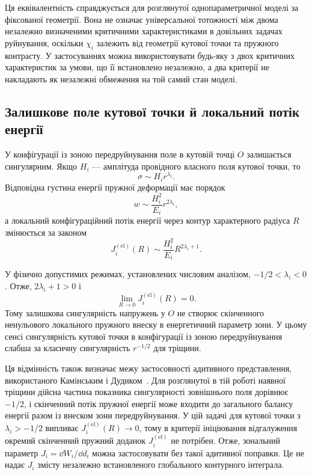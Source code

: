 Ця еквівалентність справджується для розглянутої однопараметричної моделі за фіксованої геометрії. Вона не означає універсальної тотожності між двома незалежно визначеними критичними характеристиками в довільних задачах руйнування, оскільки $\chi_i$ залежить від геометрії кутової точки та пружного контрасту. У застосуваннях можна використовувати будь-яку з двох критичних характеристик за умови, що її встановлено незалежно, а два критерії не накладають як незалежні обмеження на той самий стан моделі.

\subsection{Залишкове поле кутової точки й локальний потік енергії}
\label{subsec:discussion-flux}

У конфігурації із зоною передруйнування поле в кутовій точці $O$ залишається сингулярним. Якщо $H_i$ — амплітуда провідного власного поля кутової точки, то
\begin{equation*}
  \sigma\sim H_i r^{\lambda_i}.
\end{equation*}
Відповідна густина енергії пружної деформації має порядок
\begin{equation*}
  w\sim\frac{H_i^2}{E_i}r^{2\lambda_i},
\end{equation*}
а локальний конфігураційний потік енергії через контур характерного радіуса $R$ змінюється за законом
\begin{equation}
\label{eq:local-elastic-flux-scaling}
  J_i^{(\mathrm{el})}(R)
  \sim\frac{H_i^2}{E_i}R^{2\lambda_i+1}.
\end{equation}

У фізично допустимих режимах, установлених числовим аналізом, $-1/2<\lambda_i<0$. Отже, $2\lambda_i+1>0$ і
\begin{equation*}
  \lim_{R\to0}J_i^{(\mathrm{el})}(R)=0.
\end{equation*}
Тому залишкова сингулярність напружень у $O$ не створює скінченного ненульового локального пружного внеску в енергетичний параметр зони. У цьому сенсі сингулярність кутової точки в конфігурації із зоною передруйнування слабша за класичну сингулярність $r^{-1/2}$ для тріщини.

Ця відмінність також визначає межу застосовності адитивного представлення, використаного Камінським і Дудиком~\citeyearpar{KaminskyDudyk2026Criteria}. Для розглянутої в тій роботі наявної тріщини дійсна частина показника сингулярності зовнішнього поля дорівнює $-1/2$, і скінченний потік пружної енергії може входити до загального балансу енергії разом із внеском зони передруйнування. У цій задачі для кутової точки з $\lambda_i>-1/2$ випливає $J_i^{(\mathrm{el})}(R)\to0$, тому в критерії ініціювання відгалуження окремий скінченний пружний доданок $J_i^{(\mathrm{el})}$ не потрібен. Отже, зональний параметр $J_i=\dd W_i/\dd d_i$ можна застосовувати без такої адитивної поправки. Це не надає $J_i$ змісту незалежно встановленого глобального контурного інтеграла.

